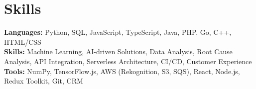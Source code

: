 \documentclass[11pt]{article}       %
\begin{document}

\vspace{-18.5pt}


\section*{Skills}
\textbf{Languages:} Python, SQL, JavaScript, TypeScript, Java, PHP, Go, C++, HTML/CSS\\
\textbf{Skills:} Machine Learning, AI-driven Solutions, Data Analysis, Root Cause Analysis, API Integration, Serverless Architecture, CI/CD, Customer Experience\\
\textbf{Tools:} NumPy, TensorFlow.js, AWS (Rekognition, S3, SQS), React, Node.js, Redux Toolkit, Git, CRM\\

\vspace{-6.5pt}
\end{document}
